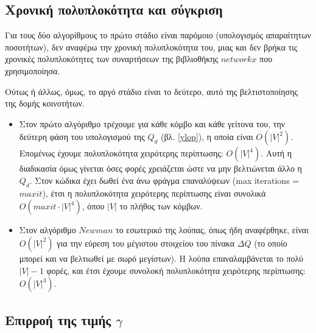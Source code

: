 \documentclass[12pt, letterpaper]{article}
\begin{document}
\subsection{Χρονική πολυπλοκότητα και σύγκριση}



Για τους δύο αλγορίθμους το πρώτο στάδιο είναι παρόμοιο (υπολογισμός απαραίτητων ποσοτήτων), δεν αναφέρω την χρονική πολυπλοκότητα
του, μιας και δεν βρήκα τις χρονικές πολυπλοκότητες των συναρτήσεων της βιβλιοθήκης
$networkx$ που χρησιμοποίησα.

Ούτως ή άλλως, όμως, το αργό στάδιο είναι το δεύτερο, αυτό της βελτιστοποίησης της 
δομής κοινοτήτων. 

\begin{itemize}
  \item Στον πρώτο αλγόριθμο τρέχουμε για κάθε κόμβο και κάθε γείτονα του, την δεύτερη
  φάση του υπολογισμού της $Q_d$ (βλ. \ref{ylop}), η οποία είναι $O(|V|^2)$. 
  Επομένως έχουμε πολυπλοκότητα χειρότερης περίπτωσης: $O(|V|^4)$. 
  Αυτή η διαδικασία όμως γίνεται όσες φορές χρειάζεται ώστε να μην βελτιώνεται άλλο 
  η $Q_d$. Στον κώδικα έχει δωθεί ένα άνω φράγμα επαναλύψεων (\textlatin{max iterations} = $maxit$),
  έτσι η πολυπλοκότητα χειρότερης περίπτωσης είναι συνολικά $O(maxit \cdot |V|^4)$,
  όπου $|V|$ το πλήθος των κόμβων.


  \item Στον αλγόριθμο $Newman$ το εσωτερικό της λούπας, όπως ήδη αναφέρθηκε, είναι 
  $O(|V|^2)$ για την εύρεση του μέγιστου στοιχείου του πίνακα $\Delta Q$ (το οποίο μπορεί 
  και να βελτιωθεί με σωρό μεγίστων). Η λούπα επαναλαμβάνεται το πολύ $|V|-1$
  φορές, και έτσι έχουμε συνολοκή πολυπλοκότητα χειρότερης περίπτωσης: $O(|V|^3)$.


\end{itemize}





\subsection{Επιρροή της τιμής $\gamma$}  \label{gamma}
\end{document}
